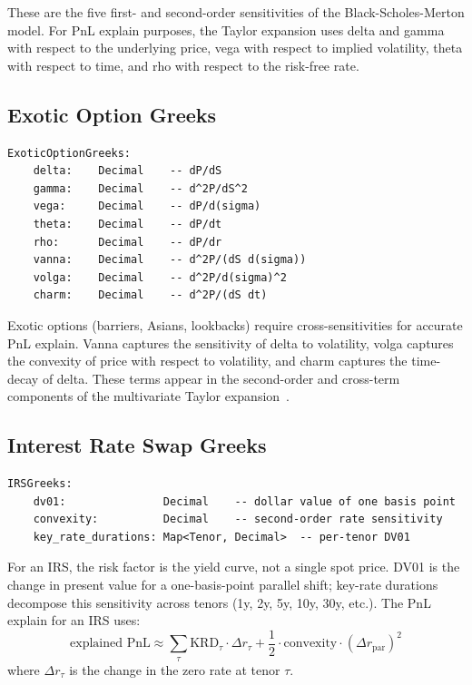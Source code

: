 \documentclass[11pt,a4paper]{article}
\begin{document}
\noindent These are the five first- and second-order sensitivities of the Black-Scholes-Merton model.  For PnL explain purposes, the Taylor expansion uses delta and gamma with respect to the underlying price, vega with respect to implied volatility, theta with respect to time, and rho with respect to the risk-free rate.

\subsection{Exotic Option Greeks}

\begin{lstlisting}
ExoticOptionGreeks:
    delta:    Decimal    -- dP/dS
    gamma:    Decimal    -- d^2P/dS^2
    vega:     Decimal    -- dP/d(sigma)
    theta:    Decimal    -- dP/dt
    rho:      Decimal    -- dP/dr
    vanna:    Decimal    -- d^2P/(dS d(sigma))
    volga:    Decimal    -- d^2P/d(sigma)^2
    charm:    Decimal    -- d^2P/(dS dt)
\end{lstlisting}

\noindent Exotic options (barriers, Asians, lookbacks) require cross-sensitivities for accurate PnL explain.  Vanna captures the sensitivity of delta to volatility, volga captures the convexity of price with respect to volatility, and charm captures the time-decay of delta.  These terms appear in the second-order and cross-term components of the multivariate Taylor expansion~\cite{pnl_explain}.

\subsection{Interest Rate Swap Greeks}

\begin{lstlisting}
IRSGreeks:
    dv01:               Decimal    -- dollar value of one basis point
    convexity:          Decimal    -- second-order rate sensitivity
    key_rate_durations: Map<Tenor, Decimal>  -- per-tenor DV01
\end{lstlisting}

\noindent For an IRS, the risk factor is the yield curve, not a single spot price.  DV01 is the change in present value for a one-basis-point parallel shift; key-rate durations decompose this sensitivity across tenors (1y, 2y, 5y, 10y, 30y, etc.).  The PnL explain for an IRS uses:
\[
\text{explained PnL} \approx \sum_{\tau} \mathrm{KRD}_\tau \cdot \Delta r_\tau + \frac{1}{2} \cdot \mathrm{convexity} \cdot (\Delta r_{\text{par}})^2
\]
where $\Delta r_\tau$ is the change in the zero rate at tenor $\tau$.
\end{document}
